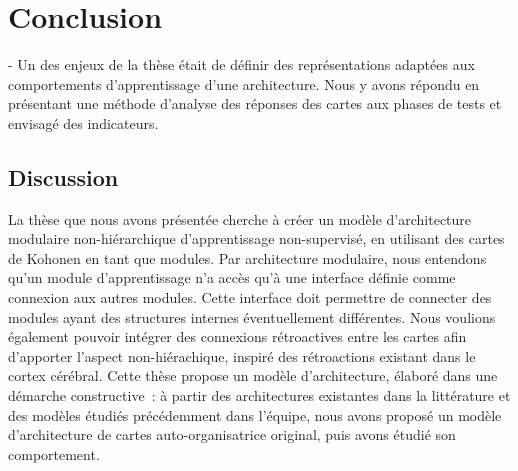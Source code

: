 \chapter*{Conclusion}

- Un des enjeux de la thèse était de définir des représentations adaptées aux comportements d'apprentissage d'une architecture. Nous y avons répondu en présentant une méthode d'analyse des réponses des cartes aux phases de tests et envisagé des indicateurs.

\section*{Discussion}

La thèse que nous avons présentée cherche à créer un modèle d'architecture modulaire non-hiérarchique d'apprentissage non-supervisé, en utilisant des cartes de Kohonen en tant que modules.
Par architecture modulaire, nous entendons qu'un module d'apprentissage n'a accès qu'à une interface définie comme connexion aux autres modules. Cette interface doit permettre de connecter des modules ayant des structures internes éventuellement différentes.
Nous voulions également pouvoir intégrer des connexions rétroactives entre les cartes afin d'apporter l'aspect non-hiérachique, inspiré des rétroactions existant dans le cortex cérébral.
Cette thèse propose un modèle d'architecture, élaboré dans une démarche constructive~: à partir des architectures existantes dans la littérature et des modèles étudiés précédemment dans l'équipe, nous avons proposé un modèle d'architecture de cartes auto-organisatrice original, puis avons étudié son comportement.

